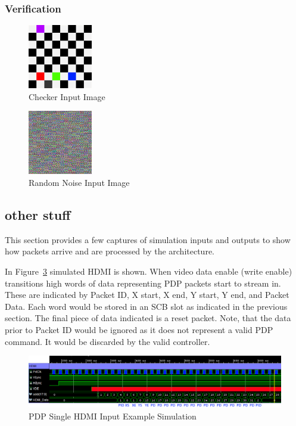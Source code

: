 \subsubsection{Verification}

\begin{figure}
    \centering
    \includegraphics[width=0.25\textwidth]{fig/checker.png}
    \caption{Checker Input Image}
    \label{fig:checker_pattern}
\end{figure}

\begin{figure}
    \centering
    \includegraphics[width=0.25\textwidth]{fig/random_noise.png}
    \caption{Random Noise Input Image}
    \label{fig:random_noise}
\end{figure}

\subsection{other stuff}
This section provides a few captures of simulation inputs and outputs to show how packets arrive and are processed by the architecture.

In Figure~\ref{fig:input_example} simulated HDMI is shown. When video data enable (write enable) transitions high words of data representing PDP packets start to stream in. These are indicated by Packet ID, X start, X end, Y start, Y end, and Packet Data. Each word would be stored in an SCB slot as indicated in the previous section. The final piece of data indicated is a reset packet. Note, that the data prior to Packet ID would be ignored as it does not represent a valid PDP command. It would be discarded by the valid controller.

\begin{figure}
    \centering
    \includegraphics[width=1.0\textwidth]{fig/pdp_input_example.png}
    \caption{PDP Single HDMI Input Example Simulation}
    \label{fig:input_example}
\end{figure}

